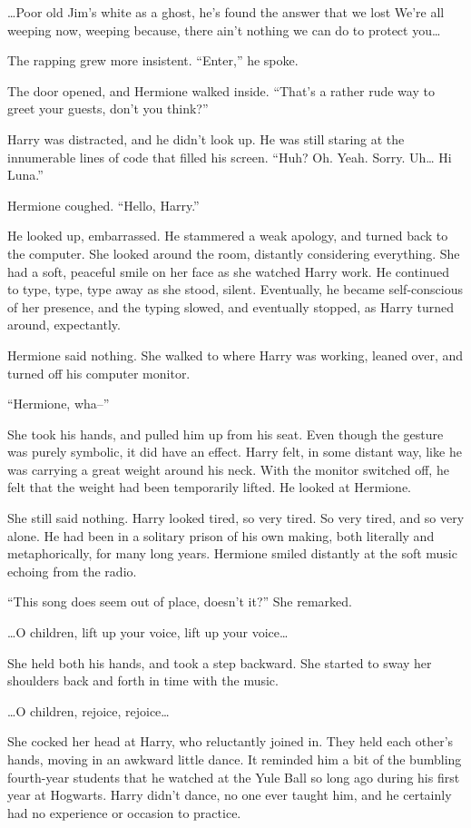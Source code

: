 …Poor old Jim’s white as a ghost, he’s found the answer that we lost
We’re all weeping now, weeping because, there ain’t nothing we can do to protect you…

The rapping grew more insistent. “Enter,” he spoke.

The door opened, and Hermione walked inside. “That’s a rather rude way to greet your guests, don’t you think?”

Harry was distracted, and he didn’t look up. He was still staring at the innumerable lines of code that filled his screen. “Huh? Oh. Yeah. Sorry. Uh… Hi Luna.”

Hermione coughed. “Hello, Harry.”

He looked up, embarrassed. He stammered a weak apology, and turned back to the computer. She looked around the room, distantly considering everything. She had a soft, peaceful smile on her face as she watched Harry work. He continued to type, type, type away as she stood, silent. Eventually, he became self-conscious of her presence, and the typing slowed, and eventually stopped, as Harry turned around, expectantly.

Hermione said nothing. She walked to where Harry was working, leaned over, and turned off his computer monitor.

“Hermione, wha–”

She took his hands, and pulled him up from his seat. Even though the gesture was purely symbolic, it did have an effect. Harry felt, in some distant way, like he was carrying a great weight around his neck. With the monitor switched off, he felt that the weight had been temporarily lifted. He looked at Hermione.

She still said nothing. Harry looked tired, so very tired. So very tired, and so very alone. He had been in a solitary prison of his own making, both literally and metaphorically, for many long years. Hermione smiled distantly at the soft music echoing from the radio.

“This song does seem out of place, doesn’t it?” She remarked.

…O children, lift up your voice, lift up your voice…

She held both his hands, and took a step backward. She started to sway her shoulders back and forth in time with the music.

…O children, rejoice, rejoice…

She cocked her head at Harry, who reluctantly joined in. They held each other’s hands, moving in an awkward little dance. It reminded him a bit of the bumbling fourth-year students that he watched at the Yule Ball so long ago during his first year at Hogwarts. Harry didn’t dance, no one ever taught him, and he certainly had no experience or occasion to practice.


